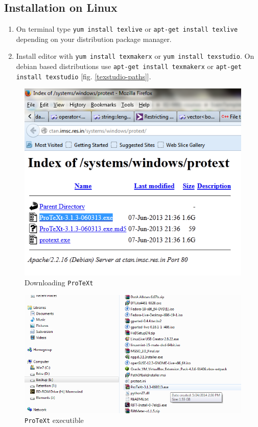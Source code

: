 \documentclass[12pt,a4paper]{article}
\begin{document}
\subsection{Installation on Linux}
\begin{enumerate}
\item On terminal type \verb|yum install texlive| or \verb|apt-get install texlive| depending on your distribution package manager.
\item Install editor with \verb|yum install texmakerx| or \verb|yum install texstudio|. On debian based distributions use \verb|apt-get install texmakerx| or \verb|apt-get install texstudio| [fig. \ref{texstudio-paths}].
\end{enumerate}
\begin{figure}[H]
\centering
\includegraphics[scale=0.75]{Figures/DownloadProTeXt.png}
\caption{Downloading \texttt{ProTeXt}}
\label{downloading-protext}
\end{figure}
\begin{figure}[H]
\centering
\includegraphics[scale=0.75]{ProTeXtexe.png}
\caption{\texttt{ProTeXt} executible}
\label{protext-exe}
\end{figure}
\end{document}
